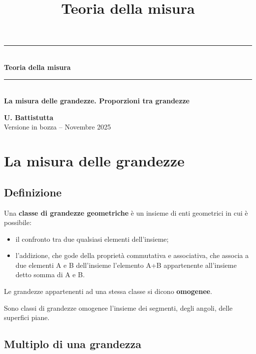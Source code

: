 \documentclass[a4paper,12pt]{article}
\title{\textbf{Teoria della misura}}
\theoremstyle{definition}
\theoremstyle{remark}
\begin{document}
\onehalfspacing

\begin{titlepage}
    \centering
    \vspace*{3cm}
    \rule{\textwidth}{0.6pt}\\[1.2em]
    {\Huge \textbf{Teoria della misura}}\\[0.8em]
    \rule{\textwidth}{0.6pt}\\[4cm]

    {\Large \textbf{La misura delle grandezze. Proporzioni tra grandezze}}\\[10cm]

    \begin{flushright}
        \textbf{U. Battistutta}\\[0.4cm]
        Versione in bozza -- Novembre 2025
    \end{flushright}
\end{titlepage}

\tableofcontents
\newpage
\setcounter{page}{1}


\section{La misura delle grandezze}

\subsection{Definizione}

Una \textbf{classe di grandezze geometriche} è un insieme di enti geometrici in cui è possibile:

\begin{itemize}
    \item il confronto tra due qualsiasi elementi dell'insieme;
    \item l'addizione, che gode della proprietà commutativa e associativa, che associa a due
    elementi A e B dell'insieme l'elemento A+B appartenente all'insieme detto somma di A e B.
\end{itemize}

Le grandezze appartenenti ad una stessa classe si dicono \textbf{omogenee}.

Sono classi di grandezze omogenee l'insieme dei segmenti, degli angoli, delle superfici piane.

\subsection{Multiplo di una grandezza}
\end{document}

